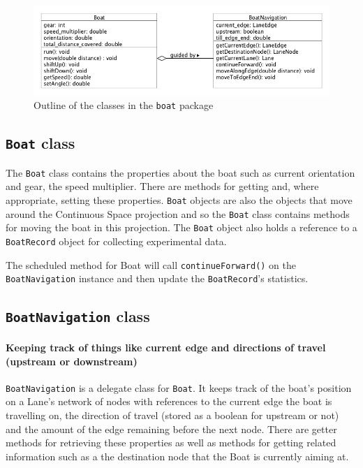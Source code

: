 \begin{figure}
\begin{center}
  \includegraphics[scale=0.3]{images/boatpackage.png}
  \caption{Outline of the classes in the \texttt{boat} package}
  \label{software:fig:boatUML}
\end{center}
\end{figure}


\subsection{\texttt{Boat} class}
The \texttt{Boat} class contains the properties about the boat such as current
orientation and gear, the speed multiplier. There are methods for
getting and, where appropriate, setting these properties. \texttt{Boat} objects are also the
objects that move around the Continuous Space projection and so the
\texttt{Boat} class contains methods for moving the boat in this
projection. The \texttt{Boat} object also holds a reference to a \texttt{BoatRecord}
object for collecting experimental data.

The scheduled method for Boat will call \texttt{continueForward()} on the
\texttt{BoatNavigation} instance and then update the \texttt{BoatRecord}'s statistics.

\subsection{\texttt{BoatNavigation} class}
\paragraph{Keeping track of things like current edge and
directions of travel (upstream or downstream)}
\texttt{BoatNavigation} is a delegate class for \texttt{Boat}. It keeps track of the
boat's position on a Lane's network of nodes with references to the
current edge the boat is travelling on, the direction of travel
(stored as a boolean for upstream or not) and the amount of the edge
remaining before the next node. There are getter methods for
retrieving these properties as well as methods for getting related
information such as a the destination node that the Boat is currently
aiming at.

